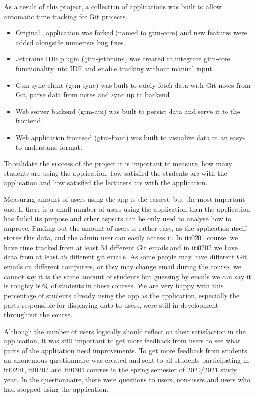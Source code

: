 As a result of this project, a collection of applications was built to allow automatic time tracking for Git projects.
\begin{itemize}
    \item Original~ application was forked (named to gtm-core) and new features were added
    alongside numerous bug fixes.
    \item Jetbrains IDE plugin (gtm-jetbrains) was created to integrate gtm-core functionality into IDE and enable tracking without manual input.
    \item Gtm-sync client (gtm-sync) was built to safely fetch data with Git notes from Git, parse data from notes and sync up to backend.
    \item Web server backend (gtm-api) was built to persist data and serve it to the frontend.
    \item Web application frontend (gtm-front) was built to visualize data in an easy-to-understand format.
\end{itemize}

To validate the success of the project it is important to measure, how many students are using the application,
how satisfied the students are with the application and how satisfied the lecturers are with the application.

Measuring amount of users using the app is the easiest, but the most important one.
If there is a small number of users using the application then the application has failed its purpose and other
aspects can be only used to analyse how to improve.
Finding out the amount of users is rather easy, as the application itself stores this data, and the admin user can easily access it.
In iti0201 course, we have time tracked from at least 34 different Git emails and in iti0202 we have data from at least 55 different git emails.
As some people may have different Git emails on different computers, or they may change email during the course, we cannot say it
is the same amount of students but guessing by emails we can say it is roughly 50\% of students in these courses.
We are very happy with this percentage of students already using the app as the application, especially the parts
responsible for displaying data to users, were still in development throughout the course.

Although the number of users logically should reflect on their satisfaction in the application, it was still important to
get more feedback from users to see what parts of the application need improvements.
To get more feedback from students an anonymous questionnaire was created and sent to all students participating in iti0201, iti0202
and iti0301 courses in the spring semester of 2020/2021 study year.
In the questionnaire, there were questions to users, non-users and users who had stopped using the application.

